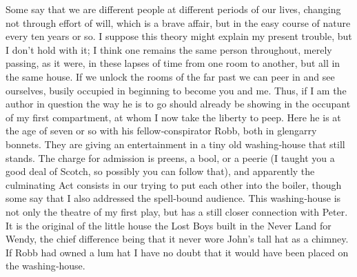 Some say that we are different people at different periods of our lives,
changing not through effort of will, which is a brave affair,
but in the easy course of nature every ten years or so.
I suppose this theory might explain my present trouble, but I don’t hold with it;
I think one remains the same person throughout,
merely passing, as it were, in these lapses of time from one room to another,
but all in the same house.
If we unlock the rooms of the far past we can peer in and see ourselves,
busily occupied in beginning to become you and me.
Thus, if I am the author in question
the way he is to go should already be showing in the occupant of my first compartment,
at whom I now take the liberty to peep.
Here he is at the age of seven or so with his fellow‐conspirator Robb, both in glengarry bonnets.
They are giving an entertainment in a tiny old washing‐house that still stands.
The charge for admission is preens, a bool, or a peerie
(I taught you a good deal of Scotch, so possibly you can follow that),
and apparently the culminating Act consists in our trying to put each other into the boiler,
though some say that I also addressed the spell‐bound audience.
This washing‐house is not only the theatre of my first play,
but has a still closer connection with Peter.
It is the original of the little house the Lost Boys built in the Never Land for Wendy,
the chief difference being that it never wore John’s tall hat as a chimney.
If Robb had owned a lum hat I have no doubt that it would have been placed on the washing‐house.

